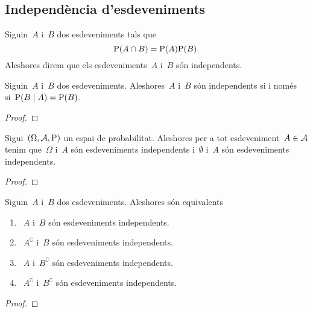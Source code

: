 \documentclass[../../main.tex]{subfiles}
\begin{document}
\subsection{Independència d'esdeveniments}
    \begin{definition}
        \label{def:esdeveniments independents}
        Siguin~\(A\) i~\(B\) dos esdeveniments tals que
        \[
            \mathrm{P}(A\cap B)=\mathrm{P}(A)\mathrm{P}(B).
        \]
        Aleshores direm que els esdeveniments~\(A\) i~\(B\) són independents.
    \end{definition}
    \begin{observation}
        \label{obs:condició equivalent a esdeveniments independents}
        Siguin~\(A\) i~\(B\) dos esdeveniments.
        Aleshores~\(A\) i~\(B\) són independents si i només si~\(\mathrm{P}(B\mid A)=\mathrm{P}(B)\).
        \begin{proof}
        \end{proof}
    \end{observation}
    \begin{example}
    \end{example}
    \begin{proposition}
        \label{prop:el buit i el total són esdeveniments independents de la resta}
        \label{prop:el buit és un esdeveniment independent de la resta}
        \label{prop:el total és un esdeveniment independent de la resta}
        Sigui~\((\Omega,\mathcal{A},\mathrm{P})\) un espai de probabilitat.
        Aleshores per a tot esdeveniment~\(A\in\mathcal{A}\) tenim que~\(\Omega\) i~\(A\) són esdeveniments independents i~\(\emptyset\) i~\(A\) són esdeveniments independents.
        \begin{proof}
        \end{proof}
    \end{proposition}
    \begin{proposition}
        \label{prop:el complementari d'un esdeveniment conserva la independència}
        Siguin~\(A\) i~\(B\) dos esdeveniments.
        Aleshores són equivalents
        \begin{enumerate}
            \item~\(A\) i~\(B\) són esdeveniments independents.
            \item~\(A^{\complement}\) i~\(B\) són esdeveniments independents.
            \item~\(A\) i~\(B^{\complement}\) són esdeveniments independents.
            \item~\(A^{\complement}\) i~\(B^{\complement}\) són esdeveniments independents.
        \end{enumerate}
        \begin{proof}
        \end{proof}
    \end{proposition}
\end{document}
